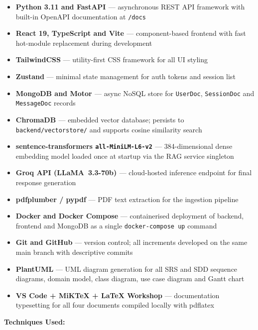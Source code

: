 \begin{itemize}
  \item \textbf{Python 3.11 and FastAPI \cite{fastapi2018}} --- asynchronous REST API
        framework with built-in OpenAPI documentation at \texttt{/docs}
  \item \textbf{React 19, TypeScript and Vite \cite{react2024}} --- component-based
        frontend with fast hot-module replacement during development
  \item \textbf{TailwindCSS} --- utility-first CSS framework for all UI styling
  \item \textbf{Zustand} --- minimal state management for auth tokens and session list
  \item \textbf{MongoDB and Motor \cite{mongodb2024}} --- async NoSQL store for
        \texttt{UserDoc}, \texttt{SessionDoc} and \texttt{MessageDoc} records
  \item \textbf{ChromaDB \cite{chromadb2023}} --- embedded vector database; persists to
        \texttt{backend/vectorstore/} and supports cosine similarity search
  \item \textbf{sentence-transformers \texttt{all-MiniLM-L6-v2}
        \cite{sentencetransformers2019}} --- 384-dimensional dense embedding model loaded
        once at startup via the RAG service singleton
  \item \textbf{Groq API (LLaMA~3.3-70b) \cite{groq2024}} --- cloud-hosted inference
        endpoint for final response generation
  \item \textbf{pdfplumber / pypdf} --- PDF text extraction for the ingestion pipeline
  \item \textbf{Docker and Docker Compose} --- containerised deployment of backend,
        frontend and MongoDB as a single \texttt{docker-compose up} command
  \item \textbf{Git and GitHub} --- version control; all increments developed on the same
        main branch with descriptive commits
  \item \textbf{PlantUML} --- UML diagram generation for all SRS and SDD sequence diagrams,
        domain model, class diagram, use case diagram and Gantt chart
  \item \textbf{VS Code + MiKTeX + LaTeX Workshop} --- documentation typesetting for all
        four documents compiled locally with pdflatex
\end{itemize}

\textbf{Techniques Used:}

